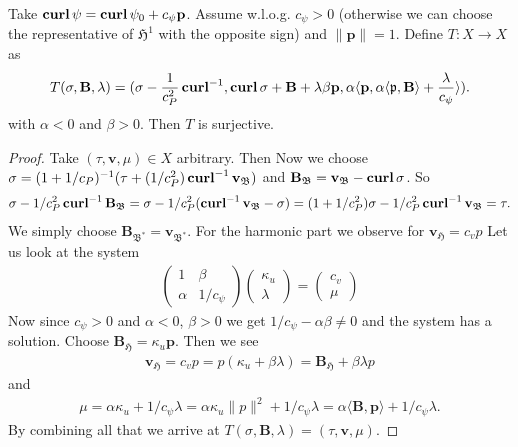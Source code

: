 \documentclass[../master_thesis.tex]{subfiles}
\begin{document}
\begin{lemma}
    Take $\veccurl \psi = \veccurl \psi_0 + c_\psi \mathbf{p}$. Assume w.l.o.g. $c_\psi >0$
    (otherwise we can choose the representative of $\mathfrak{H}^1$ with the opposite sign) 
    and $\lVert \mathbf{p}\rVert =1$.
    Define $T:X \rightarrow X$ as 
    \begin{align*}
        T(\sigma, \mathbf{B},\lambda)
        = (\sigma - \frac{1}{c_P^2}\veccurl^{-1}, \veccurl \sigma + \mathbf{B} + \lambda \beta \mathbf{p},
            \alpha \langle \mathbf{p}, \alpha \langle \mathfrak{p}, \mathbf{B} \rangle  
            + \frac{\lambda}{c_\psi} \rangle).
    \end{align*}
    with $\alpha < 0$ and $\beta>0$.
    Then $T$ is surjective. 
\end{lemma}
\begin{proof}
    Take $(\tau, \mathbf{v},\mu) \in X$ arbitrary. Then 
    Now we choose $\sigma = (1+1/c_P)^{-1} (\tau + (1/c_P^2) \veccurl^{-1} \mathbf{v}_\mathfrak{B})$ 
    and $\mathbf{B}_\mathfrak{B} = \mathbf{v}_\mathfrak{B} - \veccurl \sigma$. 
    So 
    \begin{align*}
        \sigma -  1/c_P^2 \veccurl^{-1}\mathbf{B}_\mathfrak{B} 
        = \sigma -  1/c_P^2 (\veccurl^{-1} \mathbf{v}_\mathfrak{B} - \sigma)
        = (1+1/c_P^2)\sigma - 1/c_P^2 \veccurl^{-1} \mathbf{v}_\mathfrak{B}
        = \tau.
    \end{align*}
    We simply choose $\mathbf{B}_\mathfrak{B^*} = \mathbf{v}_\mathfrak{B^*}$.
    For the harmonic part we observe for $\mathbf{v}_\mathfrak{H} = c_v p$
    Let us look at the system 
    \begin{align*}
        \begin{pmatrix}
            1 & \beta 
            \\ \alpha & 1/c_\psi
        \end{pmatrix}
        \begin{pmatrix}
            \kappa_u 
            \\ \lambda 
        \end{pmatrix}
        = 
        \begin{pmatrix}
            c_v 
            \\ \mu
        \end{pmatrix}
    \end{align*}
    Now since $c_\psi > 0$ and $\alpha < 0$, $\beta > 0$ we get 
    $1/c_\psi - \alpha \beta \neq 0$ and the system has a solution. 
    Choose $\mathbf{B}_\mathfrak{H} = \kappa_u \mathbf{p}$.
    Then we see 
    \begin{align*}
        \mathbf{v}_\mathfrak{H} = c_v p = p(\kappa_u + \beta \lambda) 
        =  \mathbf{B}_\mathfrak{H} + \beta \lambda p
    \end{align*}
    and 
    \begin{align*}
        \mu = \alpha \kappa_u + 1/c_\psi \lambda
        = \alpha \kappa_u \lVert p \rVert^2 + 1/c_\psi \lambda 
        = \alpha \langle \mathbf{B}, \mathbf{p} \rangle + 1/c_\psi \lambda.
    \end{align*}
    By combining all that we arrive at 
    $T(\sigma,\mathbf{B}, \lambda) = (\tau, \mathbf{v}, \mu)$.
\end{proof}
\end{document}
